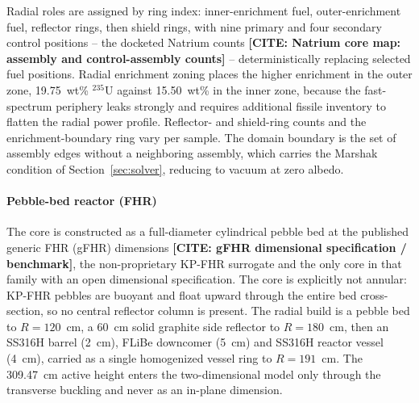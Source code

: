 \documentclass[preprint,12pt]{elsarticle}
\newcommand{\todocite}[1]{\textbf{[CITE: #1]}}
\begin{document}
Radial roles are assigned by ring index: inner-enrichment fuel,
outer-enrichment fuel, reflector rings, then shield rings, with nine primary
and four secondary control positions -- the docketed Natrium counts
\todocite{Natrium core map: assembly and control-assembly counts} --
deterministically replacing selected fuel positions. Radial enrichment zoning
places the higher enrichment in the outer zone, 19.75~wt\% $^{235}$U against
15.50~wt\% in the inner zone, because the fast-spectrum periphery leaks
strongly and requires additional fissile inventory to flatten the radial power
profile. Reflector- and shield-ring counts and the enrichment-boundary ring
vary per sample. The domain boundary is the set of assembly edges without a
neighboring assembly, which carries the Marshak condition of
Section~\ref{sec:solver}, reducing to vacuum at zero albedo.

\paragraph{Pebble-bed reactor (FHR)}
The core is constructed as a full-diameter cylindrical pebble bed at the
published generic FHR (gFHR) dimensions
\todocite{gFHR dimensional specification / benchmark}, the non-proprietary
KP-FHR surrogate and the only core in that family with an open dimensional
specification. The
core is explicitly not annular: KP-FHR pebbles are buoyant and float upward
through the entire bed cross-section, so no central reflector column is
present. The radial build is a pebble bed to $R=120$~cm, a 60~cm solid graphite
side reflector to $R=180$~cm, then an SS316H barrel (2~cm), FLiBe downcomer
(5~cm) and SS316H reactor vessel (4~cm), carried as a single homogenized vessel
ring to $R=191$~cm. The 309.47~cm active height enters the two-dimensional
model only through the transverse buckling and never as an in-plane dimension.
\end{document}
